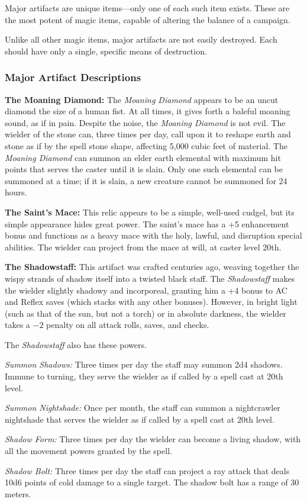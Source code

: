 Major artifacts are unique items---only one of each such item exists. These are the most potent of magic items, capable of altering the balance of a campaign.

Unlike all other magic items, major artifacts are not easily destroyed. Each should have only a single, specific means of destruction.

\subsubsection{Major Artifact Descriptions}

\textbf{The Moaning Diamond:} The \emph{Moaning Diamond} appears to be an uncut diamond the size of a human fist. At all times, it gives forth a baleful moaning sound, as if in pain. Despite the noise, the \emph{Moaning Diamond} is not evil. The wielder of the stone can, three times per day, call upon it to reshape earth and stone as if by the spell stone shape, affecting 5,000 cubic feet of material. The \emph{Moaning Diamond} can summon an elder earth elemental with maximum hit points that serves the caster until it is slain. Only one such elemental can be summoned at a time; if it is slain, a new creature cannot be summoned for 24 hours.

\textbf{The Saint's Mace:} This relic appears to be a simple, well-used cudgel, but its simple appearance hides great power. The saint's mace has a +5 enhancement bonus and functions as a heavy mace with the holy, lawful, and disruption special abilities. The wielder can project  from the mace at will, at caster level 20th.

\textbf{The Shadowstaff:} This artifact was crafted centuries ago, weaving together the wispy strands of shadow itself into a twisted black staff. The \emph{Shadowstaff} makes the wielder slightly shadowy and incorporeal, granting him a +4 bonus to AC and Reflex saves (which stacks with any other bonuses). However, in bright light (such as that of the sun, but not a torch) or in absolute darkness, the wielder takes a $-2$ penalty on all attack rolls, saves, and checks.

The \emph{Shadowstaff} also has these powers.
\begin{itemize*}
\item \textit{Summon Shadows:} Three times per day the staff may summon 2d4 shadows. Immune to turning, they serve the wielder as if called by a  spell cast at 20th level.
\item \textit{Summon Nightshade:} Once per month, the staff can summon a nightcrawler nightshade that serves the wielder as if called by a  spell cast at 20th level.
\item \textit{Shadow Form:} Three times per day the wielder can become a living shadow, with all the movement powers granted by the  spell.
\item \textit{Shadow Bolt:} Three times per day the staff can project a ray attack that deals 10d6 points of cold damage to a single target. The shadow bolt has a range of 30 meters.
\end{itemize*}
